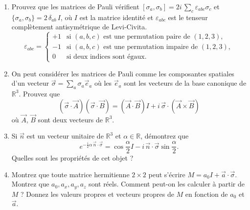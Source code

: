 \begin{enumerate}
\item Prouvez que les matrices de Pauli vérifient $[\sigma_a, \sigma_b] = 2i \, \sum_c \varepsilon_{abc} \sigma_c$ et $\lbrace\sigma_a,\sigma_b\rbrace = 2 \, \delta_{ab} \, I$, où $I$ est la matrice identité et $\varepsilon_{abc}$ est le tenseur complètement antisymétrique de Levi-Civita.
\begin{equation}
\varepsilon_{abc} = \left\lbrace
\begin{array}{cl}
+1 & \text{si } (a,b,c) \text{ est une permutation paire de }(1,2,3), \\ 
-1 & \text{si } (a,b,c) \text{ est une permutation impaire de }(1,2,3), \\  
0 & \text{si deux indices sont égaux}.
\end{array} 
\right.
\end{equation}
\item On peut considérer les matrices de Pauli comme les composantes spatiales d'un vecteur $\vec{\sigma} = \sum_a \sigma_a \vec{e}_a$ où les $\vec e_a$ sont les vecteurs de la base canonique de $\mathbb{R}^3$. Prouvez que
\begin{equation}
(\vec\sigma\cdot \vec A)(\vec\sigma \cdot \vec B) = (\vec A\cdot\vec B) I + i \, \vec\sigma \cdot (\vec A\times \vec B)
\end{equation}
où $\vec A$, $\vec B$ sont deux vecteurs de $\mathbb{R}^3$.
\item Si $\vec n$ est un vecteur unitaire de $\mathbb{R}^3$ et $\alpha\in\mathbb R$, démontrez que
\begin{equation}
e^{-\frac{i}{2} \alpha \, \vec n \cdot \vec \sigma } = \cos \frac{\alpha}{2} I - i \, \vec n \cdot \vec \sigma \sin \frac{\alpha}{2}.
\end{equation}
Quelles sont les propriétés de cet objet ?
\item Montrez que toute matrice hermitienne $2\times 2$ peut s'écrire $M = a_0 I + \vec a\cdot\vec \sigma$. Montrez que $a_0,a_x,a_y,a_z$ sont réels. Comment peut-on les calculer à partir de $M$ ? Donnez les valeurs propres et vecteurs propres de $M$ en fonction de $a_0$ et $\vec a$.
\end{enumerate}

